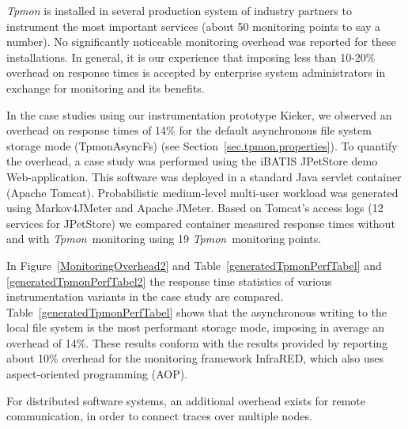 \documentclass[a4paper,12pt]{scrartcl}
\newcommand{\tpmon}{\textit{Tpmon}}
\begin{document}
\textit{Tpmon} is installed in several production system of industry partners to instrument the most important services (about 50 monitoring points to say a number). No significantly noticeable monitoring overhead was reported for these installations. In general, it is our experience that imposing less than 10-20\% overhead on response times is accepted by enterprise system administrators in exchange for monitoring and its benefits. 

In the case studies using our instrumentation prototype Kieker, we observed an overhead on response times of 14\% for the default asynchronous file system storage mode (TpmonAsyncFs) (see Section~\ref{sec.tpmon.properties}). To quantify the overhead, a case study was performed using the iBATIS JPetStore demo Web-application. This software was deployed in a standard Java servlet container (Apache Tomcat). Probabilistic medium-level multi-user workload was generated using Markov4JMeter and Apache JMeter. Based on Tomcat's access logs (12 services for JPetStore) we compared container measured response times without and with \tpmon\ monitoring using 19 \tpmon\ monitoring points.

In Figure~\ref{MonitoringOverhead2} and Table~\ref{generatedTpmonPerfTabel} and  \ref{generatedTpmonPerfTabel2} the response time statistics of various instrumentation variants in the case study are compared. Table~\ref{generatedTpmonPerfTabel} shows that the asynchronous writing to the local file system is the most performant storage mode, imposing in average an overhead of 14\%. These results conform with the results provided by \citet{GovindrajNarayananThomasNairP06OnUsingAOPforApplicationPerformanceManagement} reporting about 10\% overhead for the 
monitoring framework InfraRED, which also uses aspect-oriented programming (AOP).

For distributed software systems, an additional overhead exists for remote communication, in order to connect traces over multiple nodes. 




\end{document}
